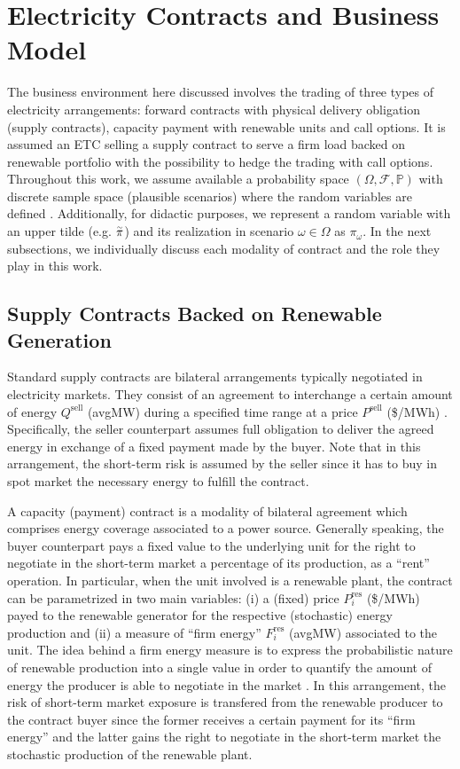 \section{Electricity Contracts and Business Model}
\label{ElectrContr}

	The business environment here discussed involves the trading of three types of electricity arrangements: forward contracts with physical delivery obligation (supply contracts), capacity payment with renewable units and call options. It is assumed an ETC selling a supply contract to serve a firm load backed on renewable portfolio with the possibility to hedge the trading with call options. Throughout this work, we assume available a probability space $(\Omega, \mathcal{F}, \mathbb{P})$ with discrete sample space (plausible scenarios) where the random variables are defined \cite{Birge_StochProgm}. Additionally, for didactic purposes, we represent a random variable with an upper tilde (e.g. $\accentset{\sim}{\pi}$) and its realization in scenario $\omega \in \Omega$ as $\pi_{\omega}$. In the next subsections, we individually discuss each modality of contract and the role they play in this work. 

\subsection{Supply Contracts Backed on Renewable Generation}
\label{SupplyContract}

	Standard supply contracts are bilateral arrangements typically negotiated in electricity markets. They consist of an agreement to interchange a certain amount of energy $Q^{\text{sell}}$ (avgMW) during a specified time range at a price $P^{\text{sell}}$ (\$/MWh) \cite{RobustSpotPrice}. Specifically, the seller counterpart assumes full obligation to deliver the agreed energy in exchange of a fixed payment made by the buyer. Note that in this arrangement, the short-term risk is assumed by the seller since it has to buy in spot market the necessary energy to fulfill the contract. 

	A capacity (payment) contract is a modality of bilateral agreement which comprises energy coverage associated to a power source. Generally speaking, the buyer counterpart pays a fixed value to the underlying unit for the right to negotiate in the short-term market a percentage of its production, as a ``rent'' operation. In particular, when the unit involved is a renewable plant, the contract can be parametrized in two main variables: (i) a (fixed) price $P_{i}^{\text{res}}$ (\$/MWh) payed to the renewable generator for the respective (stochastic) energy production and (ii) a measure of ``firm energy'' $F_{i}^{\text{res}}$ (avgMW) associated to the unit. The idea behind a firm energy measure is to express the probabilistic nature of renewable production into a single value in order to quantify the amount of energy the producer is able to negotiate in the market \cite{SupplyAdequacy}. In this arrangement, the risk of short-term market exposure is transfered from the renewable producer to the contract buyer since the former receives a certain payment for its ``firm energy'' and the latter gains the right to negotiate in the short-term market the stochastic production of the renewable plant.

